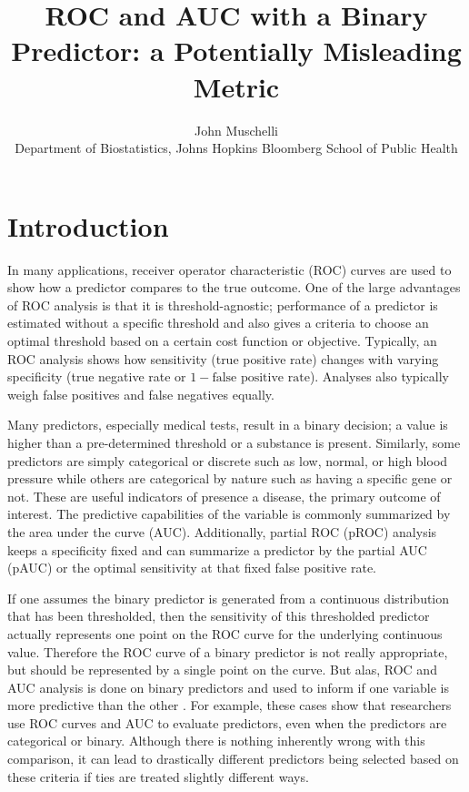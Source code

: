 \documentclass[article]{jss}
\author{
John Muschelli\\Department of Biostatistics, Johns Hopkins Bloomberg School of Public
Health
}
\title{ROC and AUC with a Binary Predictor: a Potentially Misleading Metric}
\begin{document}
\hypertarget{introduction}{%
\section{Introduction}\label{introduction}}

In many applications, receiver operator characteristic (ROC) curves are
used to show how a predictor compares to the true outcome. One of the
large advantages of ROC analysis is that it is threshold-agnostic;
performance of a predictor is estimated without a specific threshold and
also gives a criteria to choose an optimal threshold based on a certain
cost function or objective. Typically, an ROC analysis shows how
sensitivity (true positive rate) changes with varying specificity (true
negative rate or \(1 - \text{false positive rate}\)). Analyses also
typically weigh false positives and false negatives equally.

Many predictors, especially medical tests, result in a binary decision;
a value is higher than a pre-determined threshold or a substance is
present. Similarly, some predictors are simply categorical or discrete
such as low, normal, or high blood pressure while others are categorical
by nature such as having a specific gene or not. These are useful
indicators of presence a disease, the primary outcome of interest. The
predictive capabilities of the variable is commonly summarized by the
area under the curve (AUC). Additionally, partial ROC (pROC) analysis
keeps a specificity fixed and can summarize a predictor by the partial
AUC (pAUC) or the optimal sensitivity at that fixed false positive rate.

If one assumes the binary predictor is generated from a continuous
distribution that has been thresholded, then the sensitivity of this
thresholded predictor actually represents one point on the ROC curve for
the underlying continuous value. Therefore the ROC curve of a binary
predictor is not really appropriate, but should be represented by a
single point on the curve. But alas, ROC and AUC analysis is done on
binary predictors and used to inform if one variable is more predictive
than the other
\citep{jama, jama2, glaveckaite2011value, blumberg2016technology, budwega2016factors, mwipatayi}.
For example, these cases show that researchers use ROC curves and AUC to
evaluate predictors, even when the predictors are categorical or binary.
Although there is nothing inherently wrong with this comparison, it can
lead to drastically different predictors being selected based on these
criteria if ties are treated slightly different ways.
\end{document}
